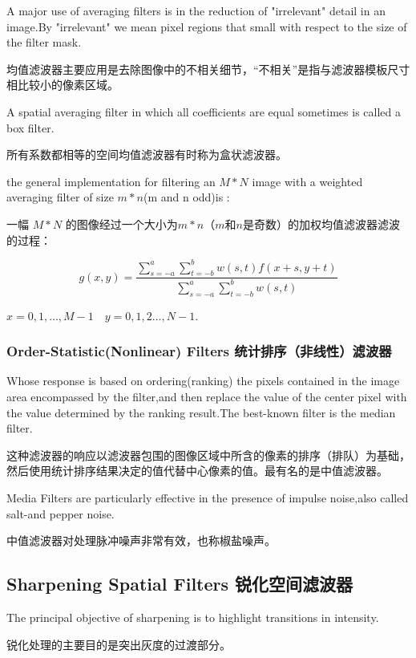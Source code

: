 \documentclass[12pt]{article}
\numberwithin{equation}{section}%
\begin{document}
A major use of averaging filters is in the reduction of "irrelevant" detail in an image.By "irrelevant" we mean pixel regions that small with respect to the size of the filter mask.

均值滤波器主要应用是去除图像中的不相关细节，“不相关”是指与滤波器模板尺寸相比较小的像素区域。

A spatial averaging filter in which all coefficients are equal sometimes is called a box filter.

所有系数都相等的空间均值滤波器有时称为盒状滤波器。

the general implementation for filtering an $M*N$ image with a weighted averaging filter of size $m*n$(m and n odd)is :

一幅 $M*N$ 的图像经过一个大小为$m*n$（$m和n$是奇数）的加权均值滤波器滤波的过程：

\begin{equation} \label {3.28}   %
g(x,y)=\frac{\sum_{s=-a}^{a}\sum_{t=-b}^{b}w(s,t)f(x+s,y+t)}{\sum_{s=-a}^{a}\sum_{t=-b}^{b}w(s,t)}
\end{equation}

$x=0,1,\ldots ,M-1\quad y=0,1,2 \dots ,N-1$.

\subsubsection{Order-Statistic(Nonlinear) Filters 统计排序（非线性）滤波器}

Whose response is based on ordering(ranking) the pixels contained in the image area encompassed by the filter,and then replace the value of the center pixel with the value determined by the ranking result.The best-known filter is the median filter.

这种滤波器的响应以滤波器包围的图像区域中所含的像素的排序（排队）为基础，然后使用统计排序结果决定的值代替中心像素的值。最有名的是中值滤波器。

Media Filters are particularly effective in the presence of impulse noise,also called salt-and pepper noise.

中值滤波器对处理脉冲噪声非常有效，也称椒盐噪声。

\subsection{Sharpening Spatial Filters 锐化空间滤波器}

The principal objective of sharpening is to highlight transitions in intensity.

锐化处理的主要目的是突出灰度的过渡部分。
\end{document}
